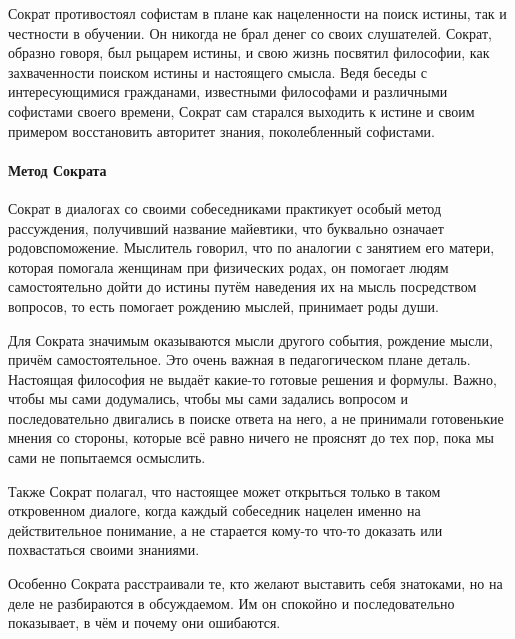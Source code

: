 Сократ противостоял софистам в плане как нацеленности на поиск истины, так и честности в обучении. Он никогда не брал денег со своих слушателей.
Сократ, образно говоря, был рыцарем истины, и свою жизнь посвятил философии, как захваченности поиском истины и настоящего смысла. Ведя беседы с интересующимися гражданами, известными философами и различными софистами своего времени, Сократ сам старался выходить к истине и своим примером восстановить авторитет знания, поколебленный софистами. 

\paragraph{Метод Сократа}

Сократ в диалогах со своими собеседниками практикует особый метод рассуждения, получивший название майевтики, что буквально означает родовспоможение. Мыслитель говорил, что по аналогии с занятием его матери, которая помогала женщинам при физических родах, он помогает людям самостоятельно дойти до истины путём наведения их на мысль посредством вопросов, то есть помогает рождению мыслей, принимает роды души. 

Для Сократа значимым оказываются мысли другого события, рождение мысли, причём самостоятельное. Это очень важная в педагогическом плане деталь. Настоящая философия не выдаёт какие-то готовые решения и формулы. Важно, чтобы мы сами додумались, чтобы мы сами задались вопросом и последовательно двигались в поиске ответа на него, а не принимали готовенькие мнения со стороны, которые всё равно ничего не прояснят до тех пор, пока мы сами не попытаемся осмыслить. 

Также Сократ полагал, что настоящее может открыться только в таком откровенном диалоге, когда каждый собеседник нацелен именно на действительное понимание, а не старается кому-то что-то доказать или похвастаться своими знаниями. 

Особенно Сократа расстраивали те, кто желают выставить себя знатоками, но на деле не разбираются в обсуждаемом. Им он спокойно и последовательно показывает, в чём и почему они ошибаются.


